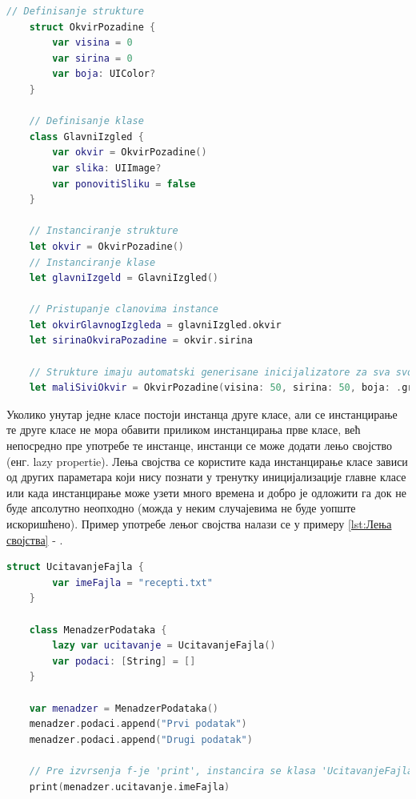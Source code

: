 \documentclass[12pt,oneside]{memoir}
\begin{document}
\begin{lstlisting}[caption=\textit{{Дефинисање класе и структуре}}, label={lst:Дефинисање класе и структуре}, language=Swift, frame=single]
    // Definisanje strukture
    struct OkvirPozadine {
        var visina = 0
        var sirina = 0
        var boja: UIColor?
    }
    
    // Definisanje klase
    class GlavniIzgled {
        var okvir = OkvirPozadine()
        var slika: UIImage?
        var ponovitiSliku = false
    }
    
    // Instanciranje strukture
    let okvir = OkvirPozadine()
    // Instanciranje klase
    let glavniIzgeld = GlavniIzgled()
    
    // Pristupanje clanovima instance
    let okvirGlavnogIzgleda = glavniIzgled.okvir
    let sirinaOkviraPozadine = okvir.sirina
    
    // Strukture imaju automatski generisane inicijalizatore za sva svojstva
    let maliSiviOkvir = OkvirPozadine(visina: 50, sirina: 50, boja: .gray)
\end{lstlisting}

\indent Уколико унутар једне класе постоји инстанца друге класе, али се инстанцирање те друге класе не мора обавити приликом инстанцирања прве класе, већ непосредно пре употребе те инстанце, инстанци се може додати лењо својство (енг. lazy propertie). Лења својства се користите када инстанцирање класе зависи од других параметара који нису познати у тренутку иницијализације главне класе или када инстанцирање може узети много времена и добро је одложити га док не буде апсолутно неопходно (можда у неким случајевима не буде уопште искоришћено). Пример употребе лењог својства налази се у примеру \ref{lst:Лења својства} - .

\begin{lstlisting}[caption=\textit{{Лења својства}}, label={lst:Лења својства}, language=Swift, frame=single]
    struct UcitavanjeFajla {
        var imeFajla = "recepti.txt"
    }
    
    class MenadzerPodataka {
        lazy var ucitavanje = UcitavanjeFajla()
        var podaci: [String] = []
    }
    
    var menadzer = MenadzerPodataka()
    menadzer.podaci.append("Prvi podatak")
    menadzer.podaci.append("Drugi podatak")
    
    // Pre izvrsenja f-je 'print', instancira se klasa 'UcitavanjeFajla'
    print(menadzer.ucitavanje.imeFajla)
\end{lstlisting}
\end{document}

